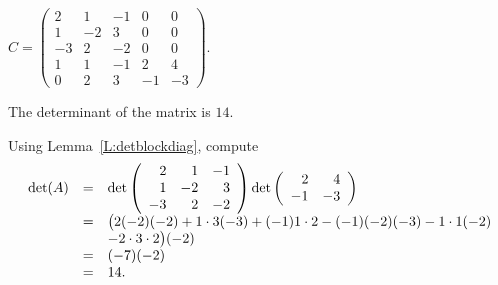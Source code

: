 \documentclass{ximera}
\begin{document}
\begin{exercise} \label{c10.1.1c}
$C = \left(\begin{array}{rrrrr} 2 & 1 & -1 & 0 & 0 \\ 1 & -2 & 3
& 0 & 0 \\ -3 & 2 & -2 & 0 & 0 \\ 1 & 1 & -1 & 2 & 4 \\ 0 & 2 &
3 & -1 & -3 \end{array} \right)$.

\begin{solution}

\ans The determinant of the matrix is $14$.

\soln Using Lemma~\ref{L:detblockdiag}, compute
\[ 
\begin{array}{rcl}
\det(A) & = & 
\det\left(\begin{array}{rrr} 2 & 1 & -1 \\ 1 & -2 & 3 \\ -3 & 2 & -2\end{array}\right)
\det\left(\begin{array}{rr} 2 & 4\\ -1 &-3\end{array}\right) \\
& = & \big(2(-2)(-2) + 1 \cdot 3(-3) + (-1)1 \cdot 2
- (-1)(-2)(-3) - 1 \cdot 1(-2) \\
& & - 2 \cdot 3 \cdot 2\big)
(-2) \\
& = & (-7)(-2) \\
& = & 14.
\end{array}
\]

\end{solution}
\end{exercise}
\end{document}
